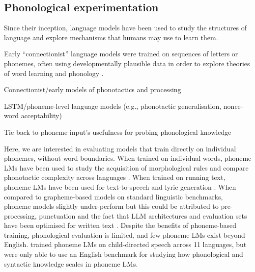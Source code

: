 \subsection{Phonological experimentation}



Since their inception, language models have been used to study the structures of language and explore mechanisms that humans may use to learn them. 

Early ``connectionist'' language models were trained on sequences of letters or phonemes, often using developmentally plausible data in order to explore theories of word learning and phonology \citep{seidenberg1989distributed, norris1994shortlist, coltheart2001drc}. 


Connectionist/early models of phonotactics and processing

LSTM/phoneme-level language models (e.g., phonotactic generalisation, nonce-word acceptability)

Tie back to phoneme input’s usefulness for probing phonological knowledge


Here, we are interested in evaluating models that train directly on individual phonemes, without word boundaries. When trained on individual words, phoneme LMs have been used to study the acquisition of morphological rules \citep{kirov-2018-recurrent} and compare phonotactic complexity across languages \citep{pimentel2020phonotactic}. When trained on running text, phoneme LMs have been used for text-to-speech \citep{li-2023-phoneme-level-bert} and lyric generation \citep{ding-2024-songcomposer}. When compared to grapheme-based models on standard linguistic benchmarks, phoneme models slightly under-perform \citep{nguyen-2022-word-boundaries, bunzeck2024graphemes} but this could be attributed to pre-processing, punctuation and the fact that LLM architectures and evaluation sets have been optimised for written text \citep{goriely2024babble}. Despite the benefits of phoneme-based training, phonological evaluation is limited, and few phoneme LMs exist beyond English. \citet{goriely2025} trained phoneme LMs on child-directed speech across 11 languages, but were only able to use an English benchmark for studying how phonological and syntactic knowledge scales in phoneme LMs. 


